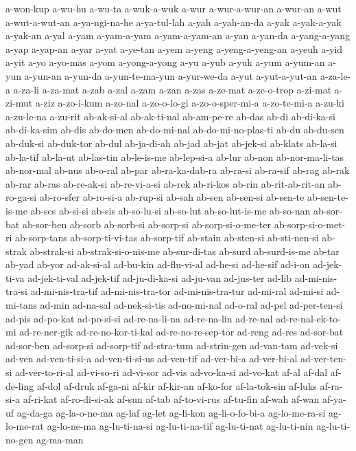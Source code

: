 {a-won-kup a-wu-hu a-wu-ta a-wuk-a-wuk a-wur a-wur-a-wur-an a-wur-an a-wut
a-wut-a-wut-an a-ya-ngi-na-he a-ya-tul-lah a-yah a-yah-an-da a-yak
a-yak-a-yak a-yak-an a-yal a-yam a-yam-a-yam a-yam-a-yam-an a-yan a-yan-da
a-yang-a-yang a-yap a-yap-an a-yar a-yat a-ye-tan a-yem a-yeng
a-yeng-a-yeng-an a-yeuh a-yid a-yit a-yo a-yo-mas a-yom a-yong-a-yong a-yu
a-yub a-yuk a-yum a-yum-an a-yun a-yun-an a-yun-da a-yun-te-ma-yun
a-yur-we-da a-yut a-yut-a-yut-an a-za-le-a a-za-li a-za-mat a-zab a-zal
a-zam a-zan a-zas a-ze-mat a-ze-o-trop a-zi-mat a-zi-mut a-ziz a-zo-i-kum
a-zo-nal a-zo-o-lo-gi a-zo-o-sper-mi-a a-zo-te-mi-a a-zu-ki a-zu-le-na
a-zu-rit ab-ak-si-al ab-ak-ti-nal ab-am-pe-re ab-das ab-di ab-di-ka-si
ab-di-ka-sim ab-dis ab-do-men ab-do-mi-nal ab-do-mi-no-plas-ti ab-du
ab-du-sen ab-duk-si ab-duk-tor ab-dul ab-ja-di-ah ab-jad ab-jat ab-jek-si
ab-klats ab-la-si ab-la-tif ab-la-ut ab-las-tin ab-le-is-me ab-lep-si-a
ab-lur ab-non ab-nor-ma-li-tas ab-nor-mal ab-nus ab-o-ral ab-par
ab-ra-ka-dab-ra ab-ra-si ab-ra-sif ab-rag ab-rak ab-rar ab-ras ab-re-ak-si
ab-re-vi-a-si ab-rek ab-ri-kos ab-rin ab-rit-ab-rit-an ab-ro-ga-si
ab-ro-sfer ab-ro-si-a ab-rup-si ab-sah ab-sen ab-sen-si ab-sen-te
ab-sen-te-is-me ab-ses ab-si-si ab-sis ab-so-lu-si ab-so-lut
ab-so-lut-is-me ab-so-nan ab-sor-bat ab-sor-ben ab-sorb ab-sorb-si
ab-sorp-si ab-sorp-si-o-me-ter ab-sorp-si-o-met-ri ab-sorp-tans
ab-sorp-ti-vi-tas ab-sorp-tif ab-stain ab-sten-si ab-sti-nen-si ab-strak
ab-strak-si ab-strak-si-o-nis-me ab-sur-di-tas ab-surd ab-surd-is-me
ab-tar ab-yad ab-yor ad-ak-si-al ad-bu-kin ad-flu-vi-al ad-he-si ad-he-sif
ad-i-on ad-jek-ti-va ad-jek-ti-val ad-jek-tif ad-ju-di-ka-si ad-ju-van
ad-jus-ter ad-lib ad-mi-nis-tra-si ad-mi-nis-tra-tif ad-mi-nis-tra-tor
ad-mi-nis-tra-tur ad-mi-ral ad-mi-si ad-mi-tans ad-min ad-na-sal
ad-nek-si-tis ad-no-mi-nal ad-o-ral ad-pel ad-per-ten-si ad-pis ad-po-kat
ad-po-si-si ad-re-na-li-na ad-re-na-lin ad-re-nal ad-re-nal-ek-to-mi
ad-re-ner-gik ad-re-no-kor-ti-kal ad-re-no-re-sep-tor ad-reng ad-res
ad-sor-bat ad-sor-ben ad-sorp-si ad-sorp-tif ad-stra-tum ad-strin-gen
ad-van-tam ad-vek-si ad-ven ad-ven-ti-si-a ad-ven-ti-si-us ad-ven-tif
ad-ver-bi-a ad-ver-bi-al ad-ver-ten-si ad-ver-to-ri-al ad-vi-so-ri
ad-vi-sor ad-vis ad-vo-ka-si ad-vo-kat af-al af-dal af-de-ling af-dol
af-druk af-ga-ni af-kir af-kir-an af-ko-for af-la-tok-sin af-luks
af-ra-si-a af-ri-kat af-ro-di-si-ak af-sun af-tab af-to-vi-rus af-tu-fin
af-wah af-wan af-ya-uf ag-da-ga ag-la-o-ne-ma ag-laf ag-let ag-li-kon
ag-li-o-fo-bi-a ag-lo-me-ra-si ag-lo-me-rat ag-lo-ne-ma ag-lu-ti-na-si
ag-lu-ti-na-tif ag-lu-ti-nat ag-lu-ti-nin ag-lu-ti-no-gen ag-ma-man
}
